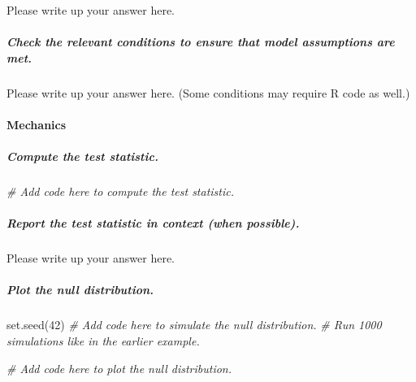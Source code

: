 \documentclass[
]{book}
\newenvironment{Shaded}{\begin{snugshade}}{\end{snugshade}}
\newcommand{\CommentTok}[1]{\textcolor[rgb]{0.56,0.35,0.01}{\textit{#1}}}
\newcommand{\DecValTok}[1]{\textcolor[rgb]{0.00,0.00,0.81}{#1}}
\newcommand{\FunctionTok}[1]{\textcolor[rgb]{0.00,0.00,0.00}{#1}}
\newcommand{\NormalTok}[1]{#1}
\begin{document}
Please write up your answer here.

\hypertarget{check-the-relevant-conditions-to-ensure-that-model-assumptions-are-met.-1}{%
\subparagraph*{Check the relevant conditions to ensure that model assumptions are met.}\label{check-the-relevant-conditions-to-ensure-that-model-assumptions-are-met.-1}}

Please write up your answer here. (Some conditions may require R code as well.)

\hypertarget{mechanics-1}{%
\paragraph*{Mechanics}\label{mechanics-1}}

\hypertarget{compute-the-test-statistic.-1}{%
\subparagraph*{Compute the test statistic.}\label{compute-the-test-statistic.-1}}

\begin{Shaded}
\begin{Highlighting}[]
\CommentTok{\# Add code here to compute the test statistic.}
\end{Highlighting}
\end{Shaded}

\hypertarget{report-the-test-statistic-in-context-when-possible.-1}{%
\subparagraph*{Report the test statistic in context (when possible).}\label{report-the-test-statistic-in-context-when-possible.-1}}

Please write up your answer here.

\hypertarget{plot-the-null-distribution.-1}{%
\subparagraph*{Plot the null distribution.}\label{plot-the-null-distribution.-1}}

\begin{Shaded}
\begin{Highlighting}[]
\FunctionTok{set.seed}\NormalTok{(}\DecValTok{42}\NormalTok{)}
\CommentTok{\# Add code here to simulate the null distribution.}
\CommentTok{\# Run 1000 simulations like in the earlier example.}
\end{Highlighting}
\end{Shaded}

\begin{Shaded}
\begin{Highlighting}[]
\CommentTok{\# Add code here to plot the null distribution.}
\end{Highlighting}
\end{Shaded}
\end{document}
